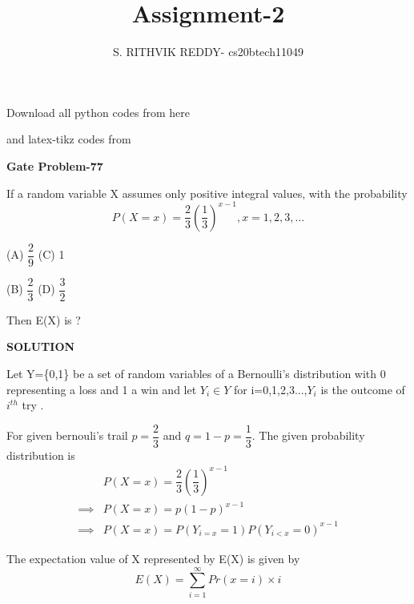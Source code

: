 \documentclass[a4paper]{article}
\title{Assignment-2}
\author{S. RITHVIK REDDY- cs20btech11049}
\date{}
\begin{document}
\maketitle
\noindent
Download all python codes from here

\begin{multicols*}{2}
\noindent
{}
    
\vspace{0.3cm}
and latex-tikz codes from  

\vspace{0.3cm}  
    
   
\vspace{0.5cm}
\textbf{Gate Problem-77}
\vspace{0.5cm}

If a random variable X assumes only positive integral values, with the probability 
$$P(X=x)=\dfrac{2}{3}\left(\dfrac{1}{3}\right)^{x-1} , x=1,2,3,...$$

(A) $\dfrac{2}{9}$ \hspace{2 cm} (C) 1

\vspace{0.5 cm}
(B) $\dfrac{2}{3}$ \hspace{2 cm} (D) $\dfrac{3}{2}$

Then E(X) is ?

\vspace{0.5cm}
\textbf{SOLUTION}
\vspace{0.5cm}

Let Y=\{0,1\} be a set of random variables of a Bernoulli's distribution with 0 representing a loss and 1 a win and let $Y_i \in Y$ for i=0,1,2,3...,$Y_i$ is the outcome of $i^{th}$ try .

For given bernouli's trail $p=\dfrac{2}{3}$ and $q=1-p=\dfrac{1}{3}$. The given probability distribution is 
\begin{align*}
&P(X=x)=\dfrac{2}{3}\left(\dfrac{1}{3}\right)^{x-1}\\
\implies &P(X=x)=p(1-p)^{x-1}\\
\implies &P(X=x)=P(Y_{i=x}=1)P(Y_{i<x}=0)^{x-1}
\end{align*}

The expectation value of X represented by E(X) is given by
$$E(X)=\sum_{i=1}^{\infty} Pr(x=i)\times i$$


\end{multicols*}
\end{document}
